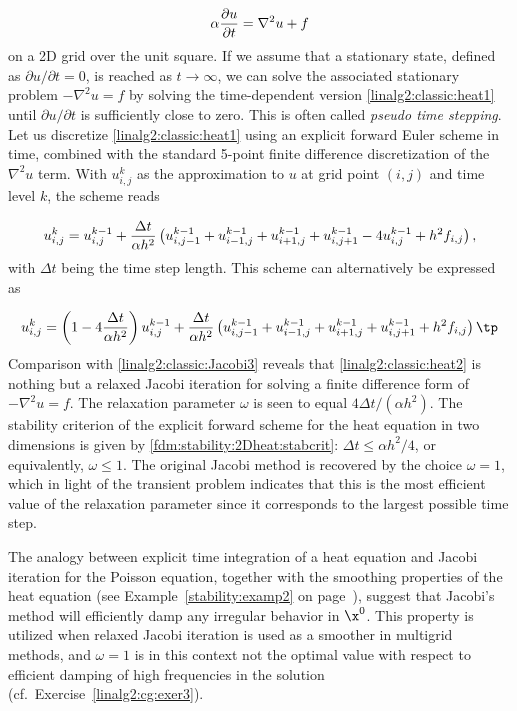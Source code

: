 \begin{equation}
\alpha{\partial u\over\partial t} = \nabla^2 u + f
\label{linalg2:classic:heat1}
\end{equation}
on a 2D grid over the unit square.
If we assume that a stationary state, defined as $\partial u/\partial t=0$,
is reached as $t\rightarrow\infty$, we can solve the
associated stationary problem  $-\nabla^2 u=f$ by solving the
time-dependent version \eqref{linalg2:classic:heat1} until
$\partial u /\partial t $ is sufficiently close to zero.
This is often called \emph{pseudo time stepping}.
Let us discretize \eqref{linalg2:classic:heat1} using an
explicit forward Euler scheme in time, combined with the standard
5-point finite difference discretization of the $\nabla^2u$ term.
With $u_{i,j}^{k}$ as the approximation to $u$ at grid point $(i,j)$ and
time level $k$, the scheme reads

\begin{equation}
u^{k}_{i,j} = u^{k-1}_{i,j} + {\Delta t\over\alpha h^2}
\left( u^{k-1}_{i,j-1} + u^{k-1}_{i-1,j} + u^{k-1}_{i+1,j} + u^{k-1}_{i,j+1}
-4 u_{i,j}^{k-1} + h^2f_{i,j}\right) ,
\end{equation}
with $\Delta t$ being the time step length.
This scheme can alternatively be expressed as

\begin{equation}
u^{k}_{i,j} = \left(1- 4{\Delta t\over\alpha h^2}\right)
u^{k-1}_{i,j} + {\Delta t\over\alpha h^2}
\left( u^{k-1}_{i,j-1} + u^{k-1}_{i-1,j} + u^{k-1}_{i+1,j} + u^{k-1}_{i,j+1}
 + h^2f_{i,j}\right) \label{linalg2:classic:heat2}\tp
\end{equation}
Comparison with \eqref{linalg2:classic:Jacobi3} reveals that
\eqref{linalg2:classic:heat2} is nothing but a relaxed Jacobi iteration
for solving a finite difference form of $-\nabla^2u=f$.
The relaxation parameter $\omega$ is seen to equal $4\Delta t/(\alpha h^2)$.
The stability criterion of the explicit forward scheme
for the heat equation in two dimensions is given by
\eqref{fdm:stability:2Dheat:stabcrit}: $\Delta t \leq \alpha h^2/4$, or
equivalently, $\omega \leq 1$.
The original Jacobi method is recovered by the choice
$\omega =1$, which  in light of
the transient problem indicates that this is the most efficient value of
the relaxation parameter since it corresponds to the largest possible
time step.

The analogy between explicit time integration of a heat equation
and Jacobi iteration for the Poisson equation, together with
the smoothing properties of the heat equation (see
Example~\ref{stability:examp2} on page~\pageref{stability:examp2}),
suggest that Jacobi's
method will efficiently damp any irregular behavior in $\x^0$.
This property is utilized when relaxed Jacobi iteration is used as a
smoother in multigrid methods, and $\omega =1$ is in this context
not the optimal value
with respect to efficient damping of high frequencies in the solution
(cf.~Exercise~\ref{linalg2:cg:exer3}).



